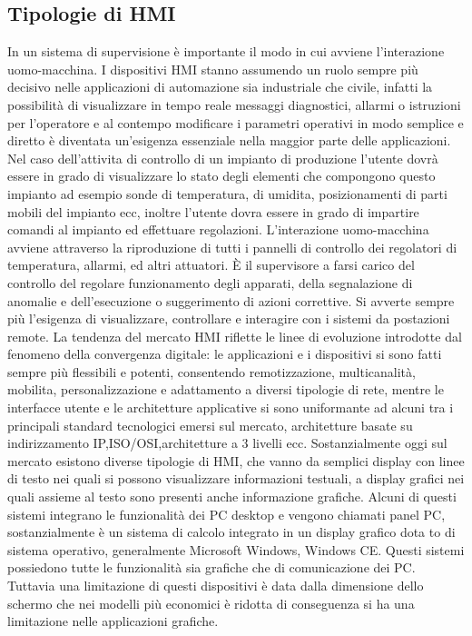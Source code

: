 \documentclass[12pt, a4paper, oneside]{book}
\begin{document}
\subsection{Tipologie di HMI}
In un sistema di supervisione è importante il modo in cui avviene l'interazione uomo-macchina. I dispositivi HMI stanno assumendo un ruolo sempre più decisivo nelle applicazioni di automazione sia industriale che civile, infatti la possibilità di visualizzare in tempo reale messaggi diagnostici,  allarmi o istruzioni per l'operatore e al contempo modificare i parametri operativi in modo semplice e diretto è diventata un'esigenza essenziale nella maggior parte delle applicazioni. Nel caso dell'attivita di controllo di un impianto di produzione l'utente dovrà essere in grado di visualizzare lo stato degli elementi che compongono questo impianto ad esempio sonde di temperatura, di umidita, posizionamenti di parti mobili del impianto ecc, inoltre l'utente dovra essere in grado di impartire comandi al impianto ed effettuare regolazioni. L'interazione uomo-macchina avviene attraverso la riproduzione di tutti i pannelli di controllo dei regolatori di temperatura, allarmi, ed altri attuatori. È il supervisore a farsi carico del controllo del regolare funzionamento degli apparati, della segnalazione di anomalie e dell'esecuzione o suggerimento di azioni correttive. Si avverte sempre più l'esigenza di visualizzare, controllare e interagire con i sistemi da postazioni remote. La tendenza del mercato HMI riflette le linee di evoluzione introdotte dal fenomeno della convergenza digitale: le applicazioni e i dispositivi si sono fatti sempre più flessibili e potenti, consentendo remotizzazione, multicanalità, mobilita, personalizzazione e adattamento a diversi tipologie di rete, mentre le interfacce utente e le architetture applicative si sono uniformante ad alcuni tra i principali standard tecnologici emersi sul mercato, architetture basate su indirizzamento IP,ISO/OSI,architetture a 3 livelli ecc. Sostanzialmente oggi sul mercato esistono diverse tipologie di HMI, che vanno da semplici display con linee di testo nei quali si possono visualizzare informazioni testuali, a display grafici nei quali assieme al testo sono presenti anche informazione grafiche. Alcuni di questi sistemi integrano le funzionalità dei PC desktop e vengono chiamati panel PC, sostanzialmente è un sistema di calcolo integrato in un display grafico dota to di sistema operativo, generalmente Microsoft Windows, Windows CE.
Questi sistemi possiedono tutte le funzionalità sia grafiche che di comunicazione dei PC. Tuttavia una limitazione di questi dispositivi è data dalla dimensione dello schermo che nei modelli più economici è ridotta di conseguenza si ha una limitazione nelle applicazioni grafiche.
\end{document}
